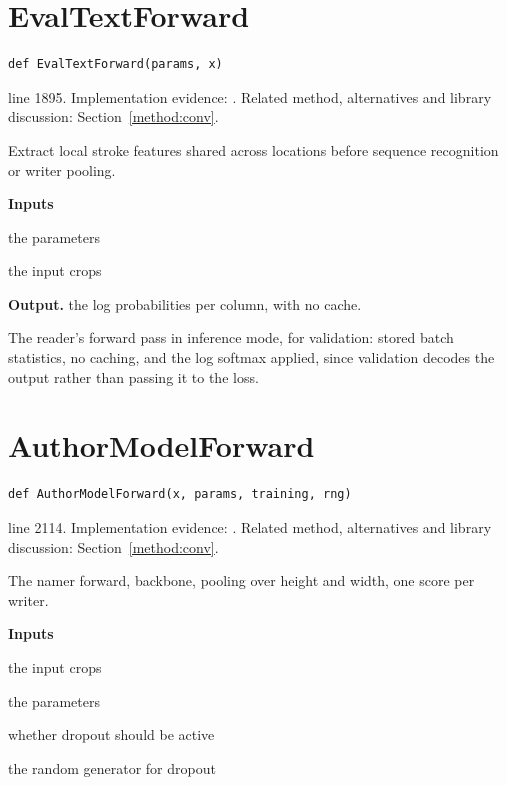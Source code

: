 \section{EvalTextForward}\label{fn:train:EvalTextForward}
\begin{lstlisting}[style=sig]
def EvalTextForward(params, x)
\end{lstlisting}
 line 1895. Implementation evidence: \cite{code2026}. Related method, alternatives and library discussion: Section~\ref{method:conv}.


Extract local stroke features shared across locations before sequence recognition or writer pooling.




\noindent\textbf{Inputs}
\begin{description}[leftmargin=2.2em,style=nextline,font=\normalfont\ttfamily]\setlength\itemsep{1pt}
  \item[{params}] \normalfont the parameters
  \item[{x}] \normalfont the input crops
\end{description}

\noindent\textbf{Output.} the log probabilities per column, with no cache.


The reader's forward pass in inference mode, for validation: stored batch statistics, no caching, and the log softmax applied, since validation decodes the output rather than passing it to the loss.



\section{AuthorModelForward}\label{fn:train:AuthorModelForward}
\begin{lstlisting}[style=sig]
def AuthorModelForward(x, params, training, rng)
\end{lstlisting}
 line 2114. Implementation evidence: \cite{code2026}. Related method, alternatives and library discussion: Section~\ref{method:conv}.


The namer forward, backbone, pooling over height and width, one score per writer.




\noindent\textbf{Inputs}
\begin{description}[leftmargin=2.2em,style=nextline,font=\normalfont\ttfamily]\setlength\itemsep{1pt}
  \item[{x}] \normalfont the input crops
  \item[{params}] \normalfont the parameters
  \item[{training}] \normalfont whether dropout should be active
  \item[{rng}] \normalfont the random generator for dropout
\end{description}

